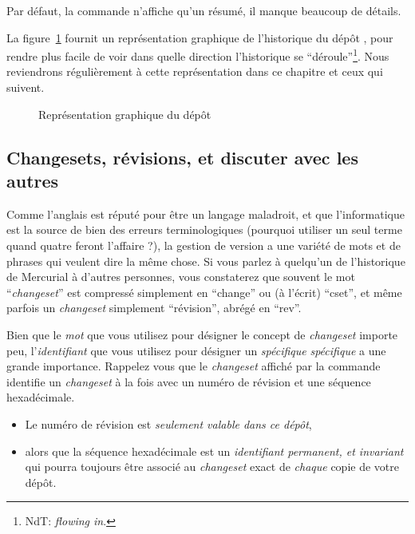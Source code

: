 Par défaut, la commande  n'affiche qu'un résumé, il manque 
beaucoup de détails.


La figure~\ref{fig:tour-basic:history} fournit un représentation graphique
de l'historique du dépôt , pour rendre plus facile de voir
dans quelle direction l'historique se ``déroule''\footnote{NdT: \textit{flowing in}.}.
Nous reviendrons régulièrement à cette représentation dans ce chapitre et
ceux qui suivent.

\begin{figure}[ht]
  \centering
  \caption{Représentation graphique du dépôt  }
  \label{fig:tour-basic:history}
\end{figure}

\subsection{Changesets, révisions, et discuter avec les autres}%

Comme l'anglais est réputé pour être un langage maladroit, et que l'informatique
est la source de bien des erreurs terminologiques (pourquoi utiliser un
seul terme quand quatre feront l'affaire ?), la gestion de version a une
variété de mots et de phrases qui veulent dire la même chose. Si vous 
parlez à quelqu'un de l'historique de Mercurial à d'autres personnes, 
vous constaterez que souvent le mot ``\textit{changeset}'' est compressé simplement
en ``change'' ou (à l'écrit) ``cset'', et même parfois un 
\textit{changeset} simplement ``révision'', abrégé en ``rev''.

Bien que le \emph{mot} que vous utilisez pour désigner le concept de
\textit{changeset} importe peu, l'\emph{identifiant} que vous utilisez
pour désigner un \emph{spécifique} \textit{spécifique} a une grande
importance. Rappelez vous que le \textit{changeset} affiché par la 
commande  identifie un \textit{changeset} à la fois avec
un numéro de révision et une séquence hexadécimale.

\begin{itemize}
\item Le numéro de révision est \emph{seulement valable dans ce dépôt},
\item alors que la séquence hexadécimale est un \emph{identifiant 
	permanent, et invariant } qui pourra toujours être associé au 
	\textit{changeset} exact de \emph{chaque} copie de votre dépôt.
\end{itemize}

